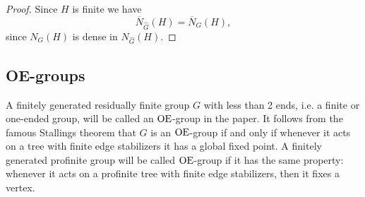 \documentclass[a4paper,12pt]{article}
\newtheorem{prop}[thm]{Proposition}
\newcommand{\Oe}{\rm \widehat{OE}}
\def\OE{{\rm OE}}
\newcommand{\C}{{\cal C}}
\begin{document}
{\begin{proof}
\medskip
Since $H$ is finite we have 
  $$\overline{N}_{\widehat{G}}(H)=\overline{N}_{G}(H),$$ since 
$N_{G}(H)$ is dense in $N_{\widehat{G}}(H)$. 



\end{proof}



\subsection{OE-groups} \label{OE groups}




A finitely generated residually finite group $G$ with less than 2 ends, i.e. a finite or one-ended group, will be called an $\OE$-group in the paper.   It follows from the famous Stallings theorem \cite{Sta} that $G$ is an $\OE$-group  if and only if whenever it acts on a tree with finite edge stabilizers
it  has a global fixed point. A finitely generated profinite group will be called $\OE$-group if it has the same property:   whenever it acts on a  profinite tree  with finite edge stabilizers, then it fixes a vertex. 

}
\end{document}
